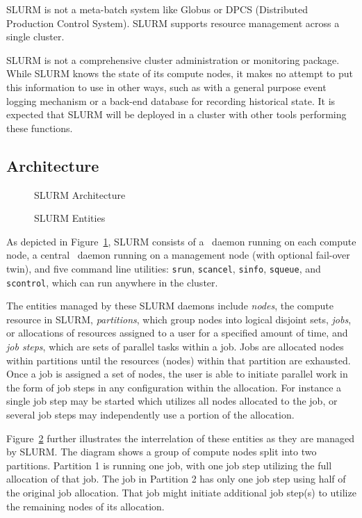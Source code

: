 SLURM is not a meta-batch system like Globus\cite{Globus2002}
or DPCS (Distributed Production Control System)\cite{DPCS2002}.  
SLURM supports resource management across a single cluster.

SLURM is not a comprehensive cluster administration or monitoring package.  
While SLURM knows the state of its compute nodes, it makes no attempt to put
this information to use in other ways, such as with a general purpose event
logging mechanism or a back-end database for recording historical state.
It is expected that SLURM will be deployed in a cluster with other 
tools performing these functions. 

\subsection{Architecture}


\begin{figure}[tb]
\centerline{}
\caption{SLURM Architecture}
\label{arch}
\end{figure}

\begin{figure}[tcb]
\centerline{}
\caption{SLURM Entities}
\label{entities}
\end{figure}


As depicted in Figure~\ref{arch}, SLURM consists of a \slurmd\ daemon
running on each compute node, a central \slurmctld\ daemon running on
a management node (with optional fail-over twin), and five command line
utilities: {\tt srun}, {\tt scancel}, {\tt sinfo}, {\tt squeue}, and 
{\tt scontrol}, which can run anywhere in the cluster.  

The entities managed by these SLURM daemons include {\em nodes}, the
compute resource in SLURM, {\em partitions}, which group nodes into
logical disjoint sets, {\em jobs}, or allocations of resources assigned
to a user for a specified amount of time, and {\em job steps}, which are
sets of parallel tasks within a job.  Jobs are allocated nodes within partitions
until the resources (nodes) within that partition are exhausted. Once
a job is assigned a set of nodes, the user is able to initiate
parallel work in the form of job steps in any configuration within the
allocation. For instance a single job step may be started which utilizes
all nodes allocated to the job, or several job steps may independently 
use a portion of the allocation.

Figure~\ref{entities} further illustrates the interrelation of these
entities as they are managed by SLURM. The diagram shows a group of
compute nodes split into two partitions. Partition 1 is running one
job, with one job step utilizing the full allocation of that job.
The job in Partition 2 has only one job step using half of the original
job allocation.
That job might initiate additional job step(s) to utilize 
the remaining nodes of its allocation.

